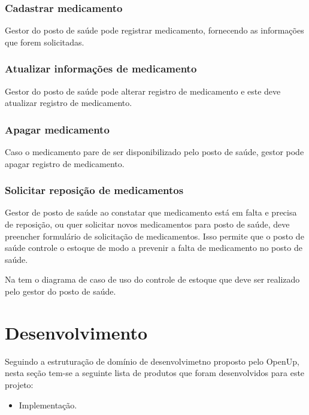\subsubsection{Cadastrar medicamento}

Gestor do posto de saúde pode registrar medicamento, fornecendo as informações que forem solicitadas.

\subsubsection{Atualizar informações de medicamento}

Gestor do posto de saúde pode alterar registro de medicamento e este deve atualizar registro de medicamento. 

\subsubsection{Apagar medicamento}

Caso o medicamento pare de ser disponibilizado pelo posto de saúde, gestor pode apagar registro de medicamento.

\subsubsection{Solicitar reposição de medicamentos}
Gestor de posto de saúde ao constatar que medicamento está em falta e precisa de reposição, ou quer solicitar novos medicamentos para posto de saúde, deve preencher formulário de solicitação de medicamentos. Isso permite que o posto de saúde controle o estoque de modo a prevenir a falta de medicamento no posto de saúde.

Na  tem o diagrama de caso de uso do controle de estoque que deve ser realizado pelo gestor do posto de saúde.

%



\section{Desenvolvimento}

Seguindo a estruturação de domínio de desenvolvimetno proposto pelo \acrfull{OpenUp}, nesta seção tem-se a seguinte lista de produtos que foram desenvolvidos para este projeto:

\begin{itemize}
    \item Implementação.
  \end{itemize}

